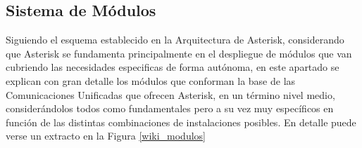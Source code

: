 
\subsection{Sistema de Módulos}

Siguiendo el esquema establecido en la Arquitectura de Asterisk, considerando que Asterisk se fundamenta principalmente en el despliegue de módulos que van cubriendo las necesidades especificas de forma autónoma, en este apartado se explican con gran detalle los módulos que conforman la base de las Comunicaciones Unificadas que ofrecen Asterisk, en un término nivel medio, considerándolos todos como fundamentales pero a su vez muy específicos en función de las distintas combinaciones de instalaciones posibles. En detalle puede verse un extracto en la Figura \ref{wiki_modulos}

